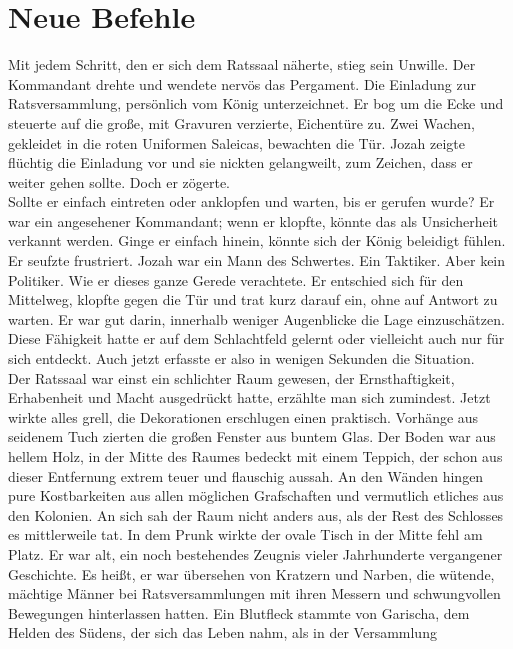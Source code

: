 
\chapter{Neue Befehle}

Mit jedem Schritt, den er sich dem Ratssaal näherte, stieg sein Unwille. Der Kommandant drehte und 
wendete nervös das Pergament. Die Einladung zur Ratsversammlung, persönlich vom König unterzeichnet. 
Er bog um die Ecke und steuerte auf die große, mit Gravuren verzierte, Eichentüre zu. Zwei Wachen, 
gekleidet in die roten Uniformen Saleicas, bewachten die Tür. Jozah zeigte flüchtig die Einladung 
vor und sie nickten gelangweilt, zum Zeichen, dass er weiter gehen sollte. Doch er zögerte.\\
 Sollte er einfach eintreten oder anklopfen und warten, bis er gerufen wurde? Er war ein angesehener 
Kommandant; wenn er klopfte, könnte das als Unsicherheit verkannt werden. Ginge er einfach hinein, 
könnte sich der König beleidigt fühlen. Er seufzte frustriert. Jozah war ein Mann des Schwertes. Ein 
Taktiker. Aber kein Politiker. Wie er dieses ganze Gerede verachtete. Er entschied sich für den 
Mittelweg, klopfte gegen die Tür und trat kurz darauf ein, ohne auf Antwort zu warten. Er war gut 
darin, innerhalb weniger Augenblicke die Lage einzuschätzen. Diese Fähigkeit hatte er auf dem 
Schlachtfeld gelernt oder vielleicht auch nur für sich entdeckt. Auch jetzt erfasste er also in 
wenigen Sekunden die Situation.\\ 
 Der Ratssaal war einst ein schlichter Raum gewesen, der Ernsthaftigkeit, Erhabenheit und Macht 
ausgedrückt hatte, erzählte man sich zumindest. Jetzt wirkte alles grell, die Dekorationen 
erschlugen einen praktisch. Vorhänge aus seidenem Tuch zierten die großen Fenster aus buntem Glas. 
Der Boden war aus hellem Holz, in der Mitte des Raumes bedeckt mit einem Teppich, der schon aus 
dieser Entfernung extrem teuer und flauschig aussah. An den Wänden hingen pure Kostbarkeiten aus 
allen möglichen Grafschaften und vermutlich etliches aus den Kolonien. An sich sah der Raum nicht 
anders aus, als der Rest des Schlosses es mittlerweile tat. In dem Prunk wirkte der ovale Tisch in 
der Mitte fehl am Platz. Er war alt, ein noch bestehendes Zeugnis vieler Jahrhunderte vergangener 
Geschichte. Es heißt, er war übersehen von Kratzern und Narben, die wütende, mächtige Männer bei 
Ratsversammlungen mit ihren Messern und schwungvollen Bewegungen hinterlassen hatten. Ein Blutfleck 
stammte von Garischa, dem Helden des Südens, der sich das Leben nahm, als in der Versammlung 
